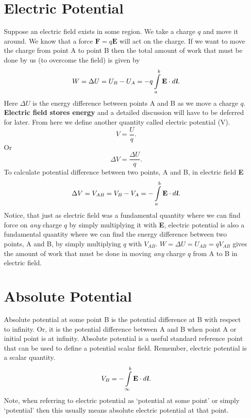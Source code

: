 \documentclass[12pt,a4paper]{article}
\begin{document}
\section{Electric Potential}
Suppose an electric field exists in some region. We take a charge $q$ and move it around. We know that a force $\textbf{F}=q\textbf{E}$ will act on the charge. If we want to move the charge from point A to point B then the total amount of work that must be done by us (to overcome the field) is given by
\begin{equation}
W=\Delta U=U_B-U_A=-q\int\limits_{a}^{b} \textbf{E}\cdot d\textbf{\textit{l}}.
\end{equation}
Here $\Delta U$ is the energy difference between points A and B as we move a charge $q$. \textbf{Electric field stores energy} and a detailed discussion will have to be deferred for later. From here we define another quantity called electric potential (V).
\begin{equation}
V=\dfrac{U}{q}.
\end{equation}
Or
\begin{equation}
\Delta V=\dfrac{\Delta U}{q}.
\end{equation}
To calculate potential difference between two points, A and B, in electric field \textbf{E}
\begin{equation}
\Delta V=V_{AB}=V_B-V_A=-\int\limits_{a}^{b} \textbf{E}\cdot d\textbf{\textit{l}}.
\end{equation}
Notice, that just as electric field was a fundamental quantity where we can find force on \textit{any} charge $q$ by simply multiplying it with \textbf{E}, electric potential is also a fundamental quantity where we can find the energy difference between two points, A and B, by simply multiplying $q$ with $V_{AB}$. $W=\Delta U=U_{AB}=qV_{AB}$ gives the amount of work that must be done in moving \textit{any} charge $q$ from A to B in electric field.
\section{Absolute Potential}
Absolute potential at some point B is the potential difference at B with respect to infinity. Or, it is the potential difference between A and B when point A or initial point is at infinity. Absolute potential is a useful standard reference point that can be used to define a potential scalar field. Remember, electric potential is a scalar quantity.
\begin{equation}
V_B=-\int\limits_{\infty}^{b} \textbf{E}\cdot d\textbf{\textit{l}}.
\end{equation}
Note, when referring to electric potential as `potential at some point' or simply `potential' then this usually means absolute electric potential at that point.
\end{document}
